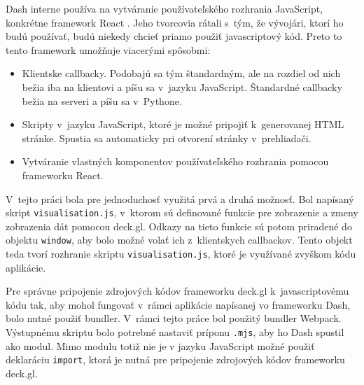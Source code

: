 Dash interne používa na vytváranie používateľského rozhrania JavaScript, konkrétne framework React \cite{dash_documentation}. Jeho tvorcovia rátali s~tým, že vývojári, ktorí ho budú používať, budú niekedy chcieť priamo použiť javascriptový kód. Preto to tento framework umožňuje viacerými spôsobmi:

\begin{itemize}
    \item Klientske callbacky. Podobajú sa tým štandardným, ale na rozdiel od nich bežia iba na klientovi a píšu sa v~jazyku JavaScript. Štandardné callbacky bežia na serveri a píšu sa v~Pythone.
    \item Skripty v~jazyku JavaScript, ktoré je možné pripojiť k~generovanej HTML stránke. Spustia sa automaticky pri otvorení stránky v~prehliadači.
    \item Vytváranie vlastných komponentov používateľského rozhrania pomocou frameworku React.
\end{itemize}

V~tejto práci bola pre jednoduchosť využitá prvá a druhá možnosť. Bol napísaný skript \texttt{visualisation.js}, v~ktorom sú definované funkcie pre zobrazenie a zmeny zobrazenia dát pomocou deck.gl. Odkazy na tieto funkcie sú potom priradené do objektu \texttt{window}, aby bolo možné volať ich z~klientskych callbackov. Tento objekt teda tvorí rozhranie skriptu \texttt{visualisation.js}, ktoré je využívané zvyškom kódu aplikácie.

Pre správne pripojenie zdrojových kódov frameworku deck.gl k~javascriptovému kódu tak, aby mohol fungovať v~rámci aplikácie napísanej vo frameworku Dash, bolo nutné použiť bundler. V~rámci tejto práce bol použitý bundler Webpack. Výstupnému skriptu bolo potrebné nastaviť príponu \texttt{.mjs}, aby ho Dash spustil ako modul. Mimo modulu totiž nie je v jazyku JavaScript možné použiť deklaráciu \texttt{import}, ktorá je nutná pre pripojenie zdrojových kódov frameworku deck.gl.

